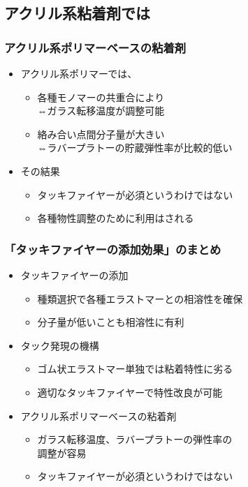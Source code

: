\documentclass[12pt, dvipdfmx]{beamer}
\begin{document}
\subsection{アクリル系粘着剤では}
\begin{frame}
	\frametitle{アクリル系ポリマーベースの粘着剤}

	\begin{itemize}
		\item アクリル系ポリマーでは、
		\begin{itemize}
			\item 各種モノマーの共重合により\\
			⇔ガラス転移温度が調整可能
			\item 絡み合い点間分子量が大きい\\
			⇔ラバープラトーの貯蔵弾性率が比較的低い
		\end{itemize}
		\item その結果
		\begin{itemize}
			\item タッキファイヤーが必須というわけではない
			\item 各種物性調整のために利用はされる
		\end{itemize}
	\end{itemize}
\end{frame}

\begin{frame}
	\frametitle{「タッキファイヤーの添加効果」のまとめ}
        \begin{boxnote}
            \vspace{-3mm}
            \begin{itemize}
                \item タッキファイヤーの添加
                    \begin{itemize}
                        \item 種類選択で各種エラストマーとの相溶性を確保
                        \item 分子量が低いことも相溶性に有利
                    \end{itemize} 
                \item タック発現の機構
                    \begin{itemize}
                        \item ゴム状エラストマー単独では粘着特性に劣る
                        \item 適切なタッキファイヤーで特性改良が可能
                    \end{itemize} 
                \item アクリル系ポリマーベースの粘着剤
                    \begin{itemize}
                        \item ガラス転移温度、ラバープラトーの弾性率の\\調整が容易
                        \item タッキファイヤーが必須というわけではない
                    \end{itemize}
            \end{itemize}
        \end{boxnote}
\end{frame}
\end{document}
